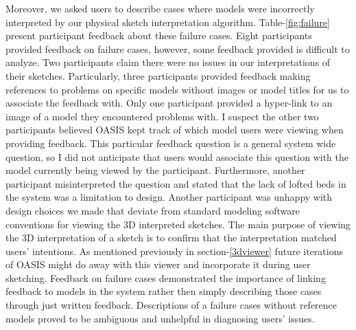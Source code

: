 Moreover, we asked users to describe cases where models were incorrectly interpreted by our physical sketch interpretation algorithm.  Table-\ref{fig:failure} present participant feedback about these failure cases.  Eight participants provided feedback on failure cases, however, some feedback provided is difficult to analyze.  Two  participants claim there were no issues in our interpretations of their sketches.  Particularly, three participants provided feedback making references to problems on specific models without images or model titles for us to associate the feedback with.  Only one participant provided a hyper-link to an image of a model they encountered problems with.  I suspect the other two participants believed OASIS kept track of which model users were viewing when providing feedback.  This particular feedback question is a general system wide question, so I did not anticipate that users would associate this question with the model currently being viewed by the participant.  Furthermore, another participant misinterpreted the question and stated that the lack of lofted beds in the system was a limitation to design.  Another participant was unhappy with design choices we made that deviate from standard modeling software conventions for viewing the 3D interpreted sketches.  The main purpose of viewing the  3D interpretation of a sketch is to confirm that the interpretation matched users' intentions. As mentioned previously in section-\ref{3dviewer} future iterations of OASIS might do away with this viewer and incorporate it during user sketching.  Feedback on failure cases demonstrated the importance of linking feedback to models in the system rather then  simply describing those cases through just written feedback.  Descriptions of a failure cases without reference models proved to be ambiguous and unhelpful in  diagnosing users' issues.  \\


